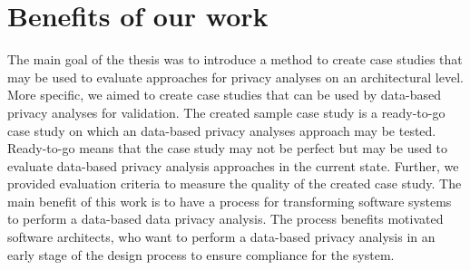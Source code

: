 \section{Benefits of our work}
The main goal of the thesis was to introduce a method to create case studies that may be used to evaluate approaches for privacy analyses on an architectural level. More specific, we aimed to create case studies that can be used by data-based privacy analyses for validation. The created sample case study is a ready-to-go case study on which an data-based privacy analyses approach may be tested. Ready-to-go means that the case study may not be perfect but may be used to evaluate data-based privacy analysis approaches in the current state.  Further, we provided evaluation criteria to measure the quality of the created case study. The main benefit of this work is to have a process for transforming software systems to perform a data-based data privacy analysis. The process benefits motivated software architects, who want to perform a data-based privacy analysis in an early stage of the design process to ensure compliance for the system.

